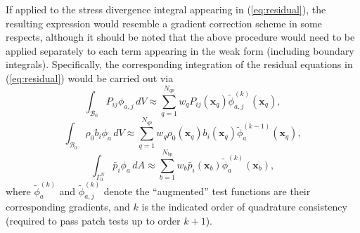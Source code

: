 	If applied to the stress divergence integral appearing in (\ref{eq:residual}), the resulting expression would resemble a gradient correction scheme in some respects, although it should be noted that the above procedure would need to be applied separately to each term appearing in the weak form (including boundary integrals). Specifically, the corresponding integration of the residual equations in (\ref{eq:residual}) would be carried out via
	\begin{equation}
		\int_{\mathcal{B}_0} P_{ij} \phi_{a,j} \, dV \approx \sum_{q=1}^{N_{qp}} w_q P_{ij} (\mathbf{x}_q) \tilde{\phi}^{(k)}_{a,j} (\mathbf{x}_q),
	\end{equation}
	\begin{equation}
		\int_{\mathcal{B}_0} \rho_0 b_i \phi_a \, dV \approx \sum_{q=1}^{N_{qp}} w_q \rho_0 (\mathbf{x}_q) b_i (\mathbf{x}_q) \tilde{\phi}^{(k-1)}_a (\mathbf{x}_q),
	\end{equation}
	\begin{equation}
		\int_{\Gamma^N_0} \bar{p}_i \phi_a \, dA \approx \sum_{b=1}^{N_{bp}} w_b  \bar{p}_i (\mathbf{x}_b) \tilde{\phi}^{(k)}_a (\mathbf{x}_b),
	\end{equation}
	where $\tilde{\phi}^{(k)}_a$ and $\tilde{\phi}^{(k)}_{a,j}$ denote the ``augmented'' test functions are their corresponding gradients, and $k$ is the indicated order of quadrature consistency (required to pass patch tests up to order $k+1$).



